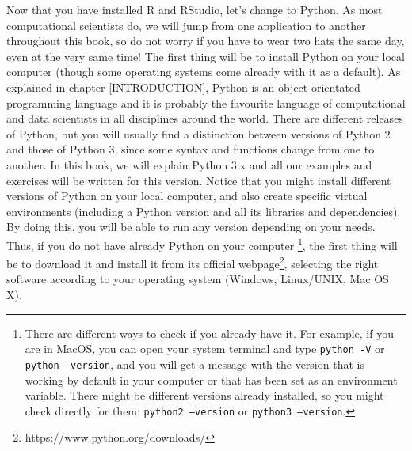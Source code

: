 Now that you have installed R and RStudio, let's change to Python. As
most computational scientists do, we will jump from one application to
another throughout this book, so do not worry if you have to wear two
hats the same day, even at the very same time! The first thing will be
to install Python on your local computer (though some operating
systems come already with it as a default). As explained in chapter
[INTRODUCTION], Python is an object-orientated programming language
and it is probably the favourite language of computational and data
scientists in all disciplines around the world. There are different
releases of Python, but you will usually find a distinction between
versions of Python 2 and those of Python 3, since some syntax and
functions change from one to another. In this book, we will explain
Python 3.x and all our examples and exercises will be written for this
version. Notice that you might install different versions of Python on
your local computer, and also create specific virtual environments
(including a Python version and all its libraries and dependencies).
By doing this, you will be able to run any version depending on your
needs. Thus, if you do not have already Python on your
computer \footnote{There are different ways to check if you already
  have it. For example, if you are in MacOS, you can open your system
  terminal and type \texttt{python -V} or \texttt{python --version}, and
  you will get a message with the version that is working by default
  in your computer or that has been set as an environment
  variable. There might be different versions already installed, so
  you might check directly for them: \texttt{python2 --version} or
  \texttt{python3 --version}.}, the first thing will be to download it
and install it from its official
webpage\footnote{https://www.python.org/downloads/}, selecting the
right software according to your operating system (Windows,
Linux/UNIX, Mac OS X).

